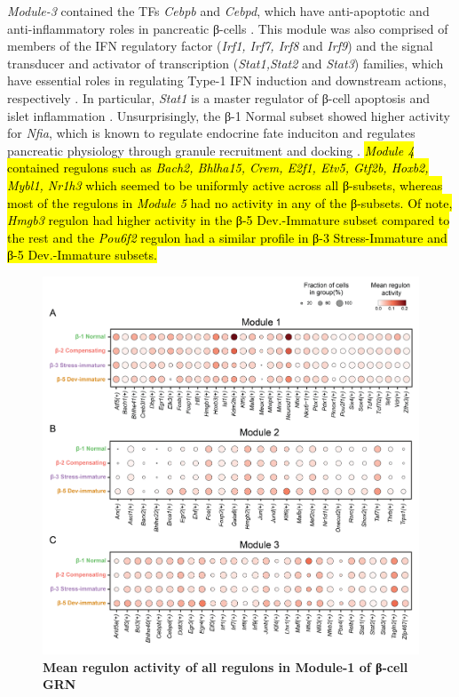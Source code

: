 \textit{Module-3} contained the TFs \textit{Cebpb} and \textit{Cebpd}, which have anti-apoptotic and anti-inflammatory roles in pancreatic β-cells \textbf{\cite{https://www.ncbi.nlm.nih.gov/pmc/articles/PMC3275575/}}. This module was also comprised of members of the IFN regulatory factor (\textit{Irf1, Irf7, Irf8} and \textit{Irf9}) and the signal transducer and activator of transcription (\textit{Stat1,Stat2} and \textit{Stat3}) families, which have essential roles in regulating Type-1 IFN induction and downstream actions, respectively \textbf{\cite{https://www.ncbi.nlm.nih.gov/pmc/articles/PMC6331453/}}. In particular, \textit{Stat1} is a master regulator of β-cell apoptosis and islet inflammation \textbf{\cite{https://www.ncbi.nlm.nih.gov/pmc/articles/PMC3020778/}}. Unsurprisingly, the β-1 Normal subset showed higher activity for \textit{Nfia}, which is known to regulate endocrine fate induciton \textbf{\cite{https://www.cell.com/cell-reports/pdf/S2211-1247(18)31869-2.pdf}} and regulates pancreatic physiology through granule recruitment and docking \textbf{\cite{https://www.biorxiv.org/content/10.1101/2019.12.24.885020v1.full}}. \hl{\textit{Module 4} contained regulons such as \textit{Bach2, Bhlha15, Crem, E2f1, Etv5, Gtf2b, Hoxb2, Mybl1, Nr1h3} which seemed to be uniformly active across all β-subsets, whereas most of the regulons in \textit{Module 5} had no activity in any of the β-subsets. Of note, \textit{Hmgb3} regulon had higher activity in the β-5 Dev.-Immature subset compared to the rest and the \textit{Pou6f2} regulon had a similar profile in β-3 Stress-Immature and β-5 Dev.-Immature subsets.}\\


\begin{figure}[t]
\centering
\includegraphics[width=12cm]{Chapter5/Fig/F3-12-03.png}
\caption[Mean regulon activity of all regulons in Module-1 of β-cell GRN]{\textbf{Mean regulon activity of all regulons in Module-1 of β-cell GRN}\\}
\label{fig:3-12-1}
\end{figure}

